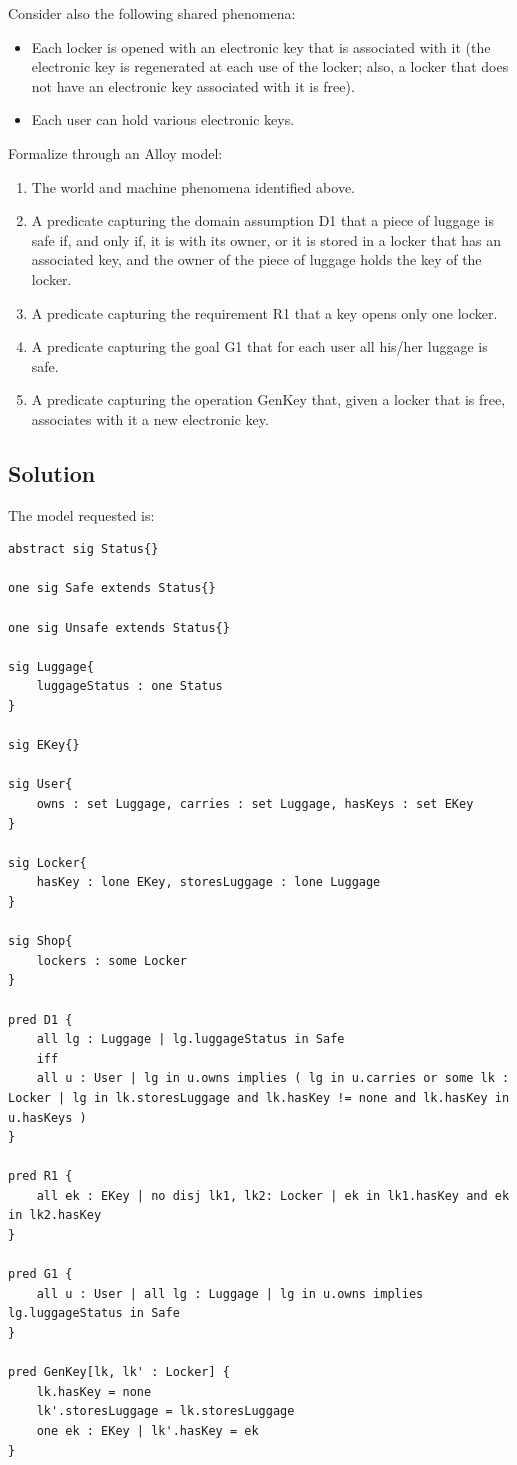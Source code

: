 \documentclass[12pt, a4paper]{report}
\newtheorem[style=M,bodystyle=\normalfont]{theorem}{Theorem}
\newtheorem[style=M,bodystyle=\normalfont]{corollary}{Corollary}
\newtheorem[style=M,bodystyle=\normalfont]{lemma}{Lemma}
\newtheorem[style=M,bodystyle=\normalfont]{definition}{Definition}
\begin{document}
        Consider also the following shared phenomena:
        \begin{itemize}
            \item Each locker is opened with an electronic key that is associated with it (the electronic key is regenerated at each use of the locker; also, a locker that does not have an electronic key associated with it is free).
            \item Each user can hold various electronic keys. 
        \end{itemize}

        Formalize through an Alloy model:
        \begin{enumerate}
            \item The world and machine phenomena identified above.
            \item A predicate capturing the domain assumption D1 that a piece of luggage is safe if, and only if, it is with its owner, or it is stored in a locker that has an associated key, and the owner of the piece of luggage holds the key of the locker.
            \item A predicate capturing the requirement R1 that a key opens only one locker.
            \item A predicate capturing the goal G1 that for each user all his/her luggage is safe.
            \item A predicate capturing the operation GenKey that, given a locker that is free, associates with it a new electronic key.
        \end{enumerate}
    \subsection*{Solution}
        The model requested is: 
        \begin{lstlisting}[language=alloy]
abstract sig Status{}

one sig Safe extends Status{} 

one sig Unsafe extends Status{}

sig Luggage{
    luggageStatus : one Status
}

sig EKey{}

sig User{
    owns : set Luggage, carries : set Luggage, hasKeys : set EKey
}

sig Locker{
    hasKey : lone EKey, storesLuggage : lone Luggage
}

sig Shop{
    lockers : some Locker
}

pred D1 {
    all lg : Luggage | lg.luggageStatus in Safe 
    iff 
    all u : User | lg in u.owns implies ( lg in u.carries or some lk : Locker | lg in lk.storesLuggage and lk.hasKey != none and lk.hasKey in u.hasKeys )
}

pred R1 {
    all ek : EKey | no disj lk1, lk2: Locker | ek in lk1.hasKey and ek in lk2.hasKey
}

pred G1 {
    all u : User | all lg : Luggage | lg in u.owns implies lg.luggageStatus in Safe
}

pred GenKey[lk, lk' : Locker] {
    lk.hasKey = none
    lk'.storesLuggage = lk.storesLuggage
    one ek : EKey | lk'.hasKey = ek 
}
        \end{lstlisting}
\end{document}
